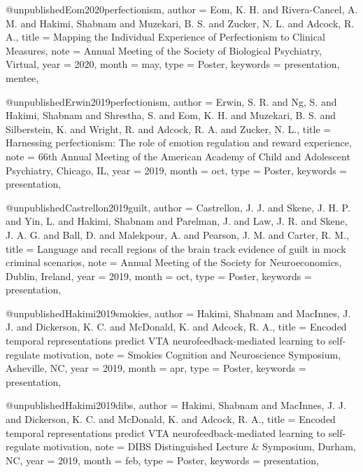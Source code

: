 @unpublished{Eom2020perfectionism,
  author   = {Eom, K. H. and Rivera-Cancel, A. M. and Hakimi, Shabnam
              and Muzekari, B. S. and Zucker, N. L. and Adcock, R. A.},
  title    = {Mapping the Individual Experience of Perfectionism to
              Clinical Measures},
  note     = {Annual Meeting of the Society of Biological Psychiatry,
              Virtual},
  year     = {2020},
  month    = may,
  type     = {Poster},
  keywords = {presentation, mentee},
}


@unpublished{Erwin2019perfectionism,
  author   = {Erwin, S. R. and Ng, S. and Hakimi, Shabnam
              and Shrestha, S. and Eom, K. H. and Muzekari, B. S.
              and Silberstein, K. and Wright, R. and Adcock, R. A.
              and Zucker, N. L.},
  title    = {Harnessing perfectionism: The role of emotion regulation
              and reward experience},
  note     = {66th Annual Meeting of the American Academy of Child and
              Adolescent Psychiatry, Chicago, IL},
  year     = {2019},
  month    = oct,
  type     = {Poster},
  keywords = {presentation},
}

@unpublished{Castrellon2019guilt,
  author   = {Castrellon, J. J. and Skene, J. H. P. and Yin, L.
              and Hakimi, Shabnam and Parelman, J. and Law, J. R.
              and Skene, J. A. G. and Ball, D. and Malekpour, A.
              and Pearson, J. M. and Carter, R. M.},
  title    = {Language and recall regions of the brain track evidence of
              guilt in mock criminal scenarios},
  note     = {Annual Meeting of the Society for Neuroeconomics,
              Dublin, Ireland},
  year     = {2019},
  month    = oct,
  type     = {Poster},
  keywords = {presentation},
}

@unpublished{Hakimi2019smokies,
  author   = {Hakimi, Shabnam and MacInnes, J. J. and Dickerson, K. C.
              and McDonald, K. and Adcock, R. A.},
  title    = {Encoded temporal representations predict {VTA}
              neurofeedback-mediated learning to self-regulate motivation},
  note     = {Smokies Cognition and Neuroscience Symposium, Asheville, NC},
  year     = {2019},
  month    = apr,
  type     = {Poster},
  keywords = {presentation},
}

@unpublished{Hakimi2019dibs,
  author   = {Hakimi, Shabnam and MacInnes, J. J. and Dickerson, K. C.
              and McDonald, K. and Adcock, R. A.},
  title    = {Encoded temporal representations predict {VTA}
              neurofeedback-mediated learning to self-regulate motivation},
  note     = {DIBS Distinguished Lecture \& Symposium, Durham, NC},
  year     = {2019},
  month    = feb,
  type     = {Poster},
  keywords = {presentation},
}


